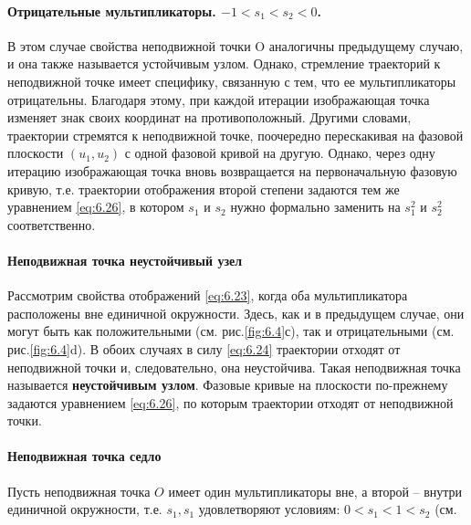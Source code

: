 \paragraph{Отрицательные мультипликаторы. $-1<s_1<s_2<0$.}%

В этом случае
свойства неподвижной точки O аналогичны предыдущему случаю, и она также
называется устойчивым узлом. Однако, стремление траекторий к неподвижной
точке имеет специфику, связанную с тем, что ее мультипликаторы
отрицательны. Благодаря этому, при каждой итерации изображающая точка
изменяет знак своих координат на противоположный. Другими словами,
траектории стремятся к неподвижной точке, поочередно перескакивая на
фазовой плоскости
$(u_1,u_2)$ с одной фазовой кривой на другую. Однако, через
одну итерацию изображающая точка вновь возвращается на первоначальную
фазовую кривую, т.е. траектории отображения второй степени задаются тем же
уравнением \eqref{eq:6.26}, в котором $s_1$ и $s_2$ нужно формально заменить на
$s_1^2$ и $s_2^2$
соответственно.

\paragraph{Неподвижная точка неустойчивый узел}%

Рассмотрим свойства отображений \eqref{eq:6.23}, когда оба мультипликатора расположены вне единичной окружности.
Здесь, как и в предыдущем случае, они могут быть как положительными (см. рис.\ref{fig:6.4}с), так и отрицательными (см. рис.\ref{fig:6.4}d). В обоих случаях в силу \eqref{eq:6.24} траектории отходят от неподвижной точки и, следовательно, она неустойчива. Такая неподвижная точка называется 
\textbf{неустойчивым узлом}. Фазовые кривые на плоскости по-прежнему задаются уравнением \eqref{eq:6.26}, по которым траектории отходят от неподвижной точки.

\paragraph{Неподвижная точка седло}%

Пусть неподвижная точка $O$ имеет один мультипликаторы вне, а второй -- внутри единичной окружности, т.е. $s_1,s_1$ удовлетворяют условиям: $0<s_1<1<s_2$ (см. 
\label{par:nepodvizhnaia_tochka_sedlo}


